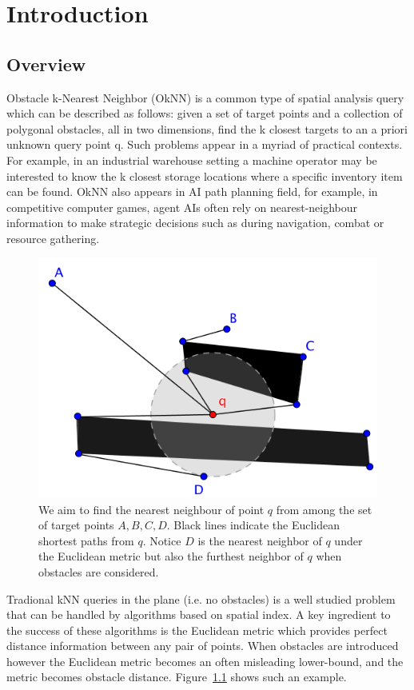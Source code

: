 \chapter{Introduction}
\section{Overview}
Obstacle k-Nearest Neighbor (OkNN) is a common type
of spatial analysis query which can be described as follows:
given a set of target points and a collection of polygonal obstacles,
all in two dimensions, find the k closest targets to
an a priori unknown query point q. Such problems appear
in a myriad of practical contexts. For example, in an industrial
warehouse setting a machine operator may be interested
to know the k closest storage locations where a specific inventory
item can be found. OkNN also appears in AI path planning field, for example,
in competitive computer games, agent AIs often rely on nearest-neighbour information
to make strategic decisions such as during navigation,
combat or resource gathering.

\begin{figure}[htp]
  \centering
  \includegraphics[width=.7\linewidth]{./pic/obs_dis.png}
  \caption{\small
  We aim to find the nearest neighbour of point $q$ from among the set of target points $A,B,C,D$.
  Black lines indicate the Euclidean shortest paths from $q$.
  Notice $D$ is the nearest neighbor of $q$ under the Euclidean metric
  but also the furthest neighbor of $q$ when obstacles are considered.}
\label{obs_dis}
\end{figure}

Tradional kNN queries in the plane (i.e. no obstacles) is a well studied problem that can be
handled by algorithms based on spatial index. A key ingredient to the success of
these algorithms is the Euclidean metric which provides perfect distance information between
any pair of points. When obstacles are introduced however the Euclidean metric becomes an often
misleading lower-bound, and the metric becomes obstacle distance. Figure~\ref{obs_dis} shows such an example.

